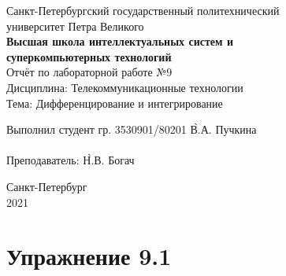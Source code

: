 \documentclass[a4paper, 14pt]{extarticle}
\begin{document}
    \begin{center}
        \begin{center}
            \hfill \break
            \normalsize{Санкт-Петербургский государственный политехнический}\\
            \normalsize{университет Петра Великого}\\
            \hfill \break
            \normalsize{\textbf{Высшая школа интеллектуальных систем и}}\\
            \normalsize{\textbf{суперкомпьютерных технологий}}\\
            \hfill \break
            \hfill \break
            \hfill \break
            \hfill \break
            \hfill \break
            \normalsize{Отчёт по лабораторной работе №9}\\
            \normalsize{Дисциплина: Телекоммуникационные технологии}\\
            \normalsize{Тема: Дифференцирование и интегрирование}\\
        \end{center}
        \hfill \break
        \hfill \break
        \hfill \break
        \hfill \break
        \hfill \break
        \hfill \break
        \hfill \break
        \hfill \break
        \hfill \break
        \hfill \break
        \begin{tabbing}
            Выполнил студент гр. 3530901/80201 \`В.А. Пучкина\\
            \\
            Преподаватель: \`Н.В. Богач\\
        \end{tabbing}
        \hfill \break
        \hfill \break
        \hfill \break
        \hfill \break
        \begin{center}
            Санкт-Петербург\\
            2021
        \end{center}
        \thispagestyle{empty}
    \end{center}

    \newpage
    \tableofcontents

    \newpage
    \listoffigures

    \newpage
    \lstlistoflistings

    \newpage
    \section{Упражнение 9.1}
    \label{sec:task1}
\end{document}
